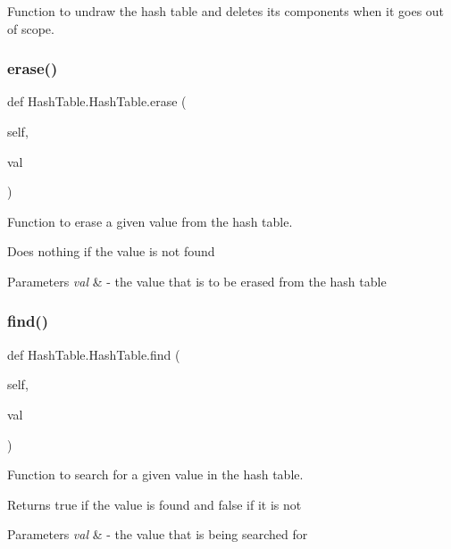 Function to undraw the hash table and deletes its components when it goes out of scope. 

\mbox{\label{class_hash_table_1_1_hash_table_a33972a0c632fec72ff9880a1b910a141}} 
\subsubsection{\texorpdfstring{erase()}{erase()}}
{\footnotesize\ttfamily def Hash\+Table.\+Hash\+Table.\+erase (\begin{DoxyParamCaption}\item[{}]{self,  }\item[{}]{val }\end{DoxyParamCaption})}



Function to erase a given value from the hash table. 

Does nothing if the value is not found


\begin{DoxyParams}{Parameters}
{\em val} & -\/ the value that is to be erased from the hash table \\
\hline
\end{DoxyParams}
\mbox{\label{class_hash_table_1_1_hash_table_a6d4d5b9daeebd3376cba8a52ab3e2704}} 
\subsubsection{\texorpdfstring{find()}{find()}}
{\footnotesize\ttfamily def Hash\+Table.\+Hash\+Table.\+find (\begin{DoxyParamCaption}\item[{}]{self,  }\item[{}]{val }\end{DoxyParamCaption})}



Function to search for a given value in the hash table. 

Returns true if the value is found and false if it is not


\begin{DoxyParams}{Parameters}
{\em val} & -\/ the value that is being searched for \\
\hline
\end{DoxyParams}
\mbox{\label{class_hash_table_1_1_hash_table_a7339efb6b22404d54bbea45484a2c908}} 
